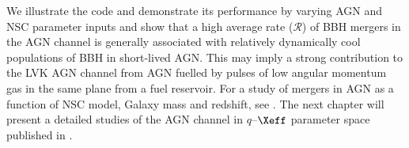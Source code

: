 We illustrate the code and demonstrate its performance by varying AGN and NSC parameter inputs and show that a high average rate ($\mathcal{R}$) of BBH mergers in the AGN channel is generally associated with relatively dynamically cool populations of BBH in short-lived AGN.
This may imply a strong contribution to the LVK AGN channel from AGN fuelled by pulses of low angular momentum gas in the same plane from a fuel reservoir.
For a study of mergers in AGN as a function of NSC model, Galaxy mass and redshift, see \citet{Delfavero+25-mcfactsIII}.
The next chapter will present a detailed studies of the AGN channel in $q$--$\Xeff$ parameter space published in \citet{Cook+25}.

